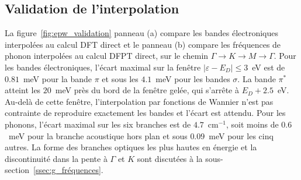 \subsection{Validation de l'interpolation}

La figure~\ref{fig:epw_validation} panneau (a) compare les bandes électroniques interpolées au calcul DFT direct et le panneau (b) compare les fréquences de phonon interpolées au calcul DFPT direct, sur le chemin $\Gamma\to K\to M\to \Gamma$. Pour les bandes électroniques, l'écart maximal sur la fenêtre $|\varepsilon-E_D|\leq 3$~eV est de $0.81$~meV pour la bande $\pi$ et sous les $4.1$~meV pour les bandes $\sigma$. La bande $\pi^*$ atteint les $20$~meV près du bord de la fenêtre gelée, qui s'arrête à $E_D+2.5$~eV. Au-delà de cette fenêtre, l'interpolation par fonctions de Wannier n'est pas contrainte de reproduire exactement les bandes et l'écart est attendu. Pour les phonons, l'écart maximal sur les six branches est de $4.7$~cm$^{-1}$, soit moins de $0.6$~meV pour la branche acoustique hors plan et sous $0.09$~meV pour les cinq autres. La forme des branches optiques les plus hautes en énergie et la discontinuité dans la pente à $\Gamma$ et $K$ sont discutées à la sous-section~\ref{ssec:g_fréquences}.

